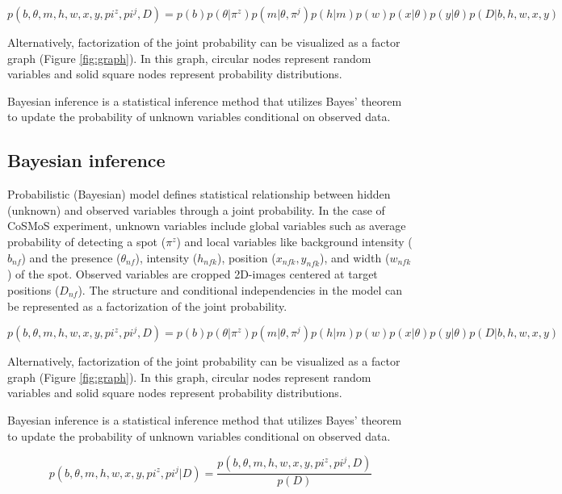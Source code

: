 \textbf{\begin{equation*}
    p(b,\theta,m,h,w,x,y,pi^z,pi^j,D) = p(b)p(\theta|\pi^z)p(m|\theta,\pi^j)p(h|m)p(w)p(x|\theta)p(y|\theta)p(D|b,h,w,x,y)
\end{equation*}}


Alternatively, factorization of the joint probability can be visualized as a factor graph (Figure \ref{fig:graph}). In this graph, circular nodes represent random variables and solid square nodes represent probability distributions.

Bayesian inference is a statistical inference method that utilizes Bayes' theorem to update the probability of unknown variables conditional on observed data.

\subsection{Bayesian inference}

Probabilistic (Bayesian) model defines statistical relationship between hidden (unknown) and observed variables through a joint probability. In the case of CoSMoS experiment, unknown variables include global variables such as average probability of detecting a spot ($\pi^z$) and local variables like background intensity ($b_{nf}$) and the presence ($\theta_{nf}$), intensity ($h_{nfk}$), position ($x_{nfk}, y_{nfk}$), and width ($w_{nfk}$) of the spot. Observed variables are cropped 2D-images centered at target positions ($D_{nf}$). The structure and conditional independencies in the model can be represented as a factorization of the joint probability.

\textbf{\begin{equation*}
    p(b,\theta,m,h,w,x,y,pi^z,pi^j,D) = p(b)p(\theta|\pi^z)p(m|\theta,\pi^j)p(h|m)p(w)p(x|\theta)p(y|\theta)p(D|b,h,w,x,y)
\end{equation*}}

Alternatively, factorization of the joint probability can be visualized as a factor graph (Figure \ref{fig:graph}). In this graph, circular nodes represent random variables and solid square nodes represent probability distributions.

Bayesian inference is a statistical inference method that utilizes Bayes' theorem to update the probability of unknown variables conditional on observed data.

\textbf{\begin{equation*}
    p(b,\theta,m,h,w,x,y,pi^z,pi^j|D) = 
    \dfrac{p(b,\theta,m,h,w,x,y,pi^z,pi^j,D)}{p(D)}
\end{equation*}}

